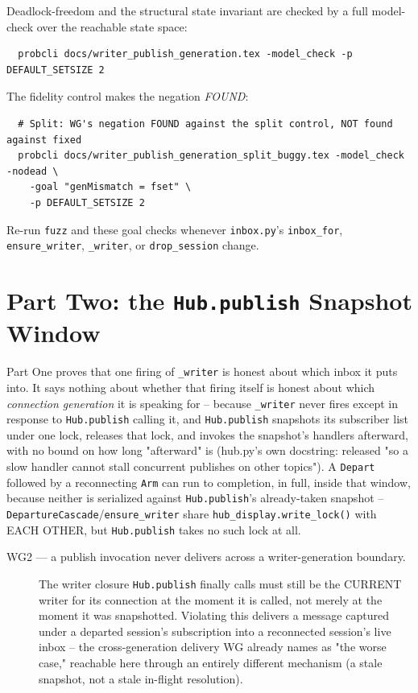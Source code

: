 \documentclass[a4paper,10pt,fleqn]{article}
\begin{document}
Deadlock-freedom and the structural state invariant are checked by a full
model-check over the reachable state space:

\begin{verbatim}
  probcli docs/writer_publish_generation.tex -model_check -p DEFAULT_SETSIZE 2
\end{verbatim}

The fidelity control makes the negation \emph{FOUND}:

\begin{verbatim}
  # Split: WG's negation FOUND against the split control, NOT found against fixed
  probcli docs/writer_publish_generation_split_buggy.tex -model_check -nodead \
    -goal "genMismatch = fset" \
    -p DEFAULT_SETSIZE 2
\end{verbatim}

Re-run \texttt{fuzz} and these goal checks whenever \texttt{inbox.py}'s
\texttt{inbox\_for}, \texttt{ensure\_writer}, \texttt{\_writer}, or
\texttt{drop\_session} change.

\part{Part Two: the \texttt{Hub.publish} Snapshot Window}
\label{sec:parttwo}

Part One proves that one firing of \texttt{\_writer} is honest about which
inbox it puts into. It says nothing about whether that firing itself is
honest about which \emph{connection generation} it is speaking for --
because \texttt{\_writer} never fires except in response to
\texttt{Hub.publish} calling it, and \texttt{Hub.publish} snapshots its
subscriber list under one lock, releases that lock, and invokes the
snapshot's handlers afterward, with no bound on how long "afterward" is
(hub.py's own docstring: released "so a slow handler cannot stall concurrent
publishes on other topics"). A \texttt{Depart} followed by a reconnecting
\texttt{Arm} can run to completion, in full, inside that window, because
neither is serialized against \texttt{Hub.publish}'s already-taken snapshot
-- \texttt{DepartureCascade}/\texttt{ensure\_writer} share
\texttt{hub\_display.write\_lock()} with EACH OTHER, but \texttt{Hub.publish}
takes no such lock at all.

\begin{description}
  \item[WG2 --- a publish invocation never delivers across a writer-generation
    boundary.] The writer closure \texttt{Hub.publish} finally calls must
    still be the CURRENT writer for its connection at the moment it is
    called, not merely at the moment it was snapshotted. Violating this
    delivers a message captured under a departed session's subscription into
    a reconnected session's live inbox -- the cross-generation delivery WG
    already names as "the worse case," reachable here through an entirely
    different mechanism (a stale snapshot, not a stale in-flight resolution).
\end{description}
\end{document}
